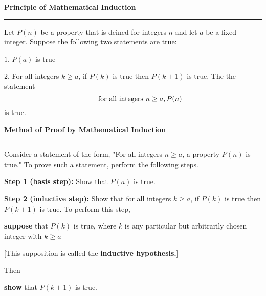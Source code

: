 {\bf Principle of Mathematical Induction}
\vskip 1mm
\hrule

\vskip 6pt
Let $P(n)$ be a property that is deined for integers $n$ and let $a$ be a fixed integer. Suppose the following two statements are true:

\vskip 1mm
$1.$ $P(a)$ is true

\vskip 1mm
$2.$ For all integers $k\geq a$, if $P(k)$ is true then $P(k+1)$ is true. The the statement $$\qquad\hbox{for all integers $n \geq a, P(n)$}$$ is true.

\vskip 1cm
{\bf Method of Proof by Mathematical Induction}
\vskip 1mm
\hrule

\vskip 6pt
Consider a statement of the form, "For all integers $n\geq a$, a property $P(n)$ is true." To prove such a statement, perform the following steps.

\vskip 1mm
{\bf Step 1 (basis step):} Show that $P(a)$ is true.

\vskip 1pc
{\bf Step 2 (inductive step):} Show that for all integers $k\geq a$, if $P(k)$ is true then $P(k+1)$ is true. To perform this step,

\vskip 1mm
\centerline{{\bf suppose} that $P(k)$ is true, where $k$ is any particular but arbitrarily chosen integer with $k\geq a$}

\vskip 1mm
\centerline{[This supposition is called the {\bf inductive hypothesis.}]}

\vskip 1mm
Then

\vskip 1mm
{\bf show} that $P(k+1)$ is true.

\vfill\eject
